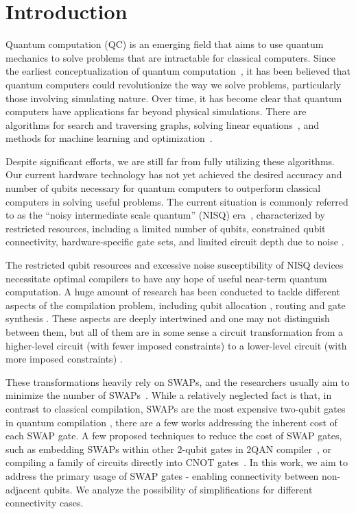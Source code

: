 \chapter{Introduction}

Quantum computation (QC) is an emerging field that aims to use quantum mechanics to solve problems that are intractable for classical computers. Since the earliest conceptualization of quantum computation~\cite{feynman1986}, it has been believed that quantum computers could revolutionize the way we solve problems, particularly those involving simulating nature. Over time, it has become clear that quantum computers have applications far beyond physical simulations. There are algorithms for search and traversing graphs, solving linear equations~\cite{montanaro2016}, and methods for machine learning and optimization~\cite{jordan2023}.

Despite significant efforts, we are still far from fully utilizing these algorithms. Our current hardware technology has not yet achieved the desired accuracy and number of qubits necessary for quantum computers to outperform classical computers in solving useful problems. The current situation is commonly referred to as the ``noisy intermediate scale quantum'' (NISQ) era~\cite{preskill2018}, characterized by restricted resources, including a limited number of qubits, constrained qubit connectivity, hardware-specific gate sets, and limited circuit depth due to noise \cite{cross2019}.

The restricted qubit resources and excessive noise susceptibility of NISQ devices necessitate optimal compilers to have any hope of useful near-term quantum computation. A huge amount of research has been conducted to tackle different aspects of the compilation problem, including qubit allocation \cite{itoko2019,siraichi2018,paler2019,zhang2021,li2019}, routing \cite{childs,itoko2019,cowtan2019,nash2020,kissinger2019} and gate synthesis \cite{shende2006,vatan2004,vatan2004a,shende2004,barenco1995,dawson2006}. These aspects are deeply intertwined and one may not distinguish between them, but all of them are in some sense a circuit transformation from a higher-level circuit (with fewer imposed constraints) to a lower-level circuit (with more imposed constraints) \cite{hundt2022}.

These transformations heavily rely on SWAPs, and the researchers usually aim to minimize the number of SWAPs~\cite{childs,qiskit2023,sivarajah2021,itoko2019,li2019}. While a relatively neglected fact is that, in contrast to classical compilation, SWAPs are the most expensive two-qubit gates in quantum compilation \cite{vatan2004}, there are a few works addressing the inherent cost of each SWAP gate. A few proposed techniques to reduce the cost of SWAP gates, such as embedding SWAPs within other 2-qubit gates in 2QAN compiler~\cite{lao2021}, or compiling a family of circuits directly into CNOT gates~\cite{kissinger2019,nash2020}. In this work, we aim to address the primary usage of SWAP gates - enabling connectivity between non-adjacent qubits. We analyze the possibility of simplifications for different connectivity cases.

